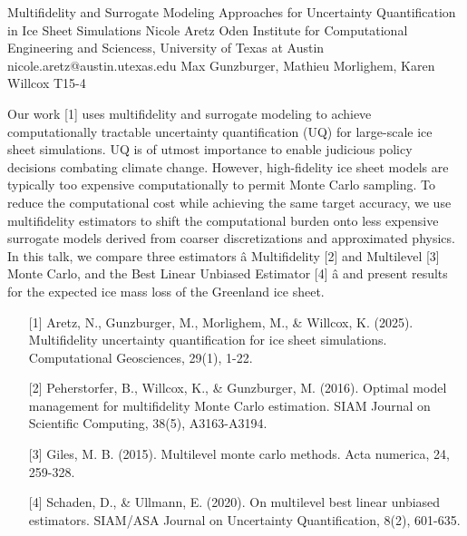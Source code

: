 \begin{talk}
  {Multifidelity and Surrogate Modeling Approaches for Uncertainty Quantification in Ice Sheet Simulations}%
  {Nicole Aretz}%
  {Oden Institute for Computational Engineering and Sciencess, University of Texas at Austin}%
  {nicole.aretz@austin.utexas.edu}%
  {Max Gunzburger, Mathieu Morlighem, Karen Willcox}%
  {T15-4}%
			
Our work [1] uses multifidelity and surrogate modeling to achieve computationally tractable uncertainty quantification (UQ) for large-scale ice sheet simulations. UQ is of utmost importance to enable judicious policy decisions combating climate change. However, high-fidelity ice sheet models are typically too expensive computationally to permit Monte Carlo sampling. To reduce the computational cost while achieving the same target accuracy, we use multifidelity estimators to shift the computational burden onto less expensive surrogate models derived from coarser discretizations and approximated physics. In this talk, we compare three estimators â Multifidelity [2] and Multilevel [3] Monte Carlo, and the Best Linear Unbiased Estimator [4] â and present results for the expected ice mass loss of the Greenland ice sheet.

\medskip

\begin{enumerate}
	\item[{[1]}] Aretz, N., Gunzburger, M., Morlighem, M., \& Willcox, K. (2025). Multifidelity uncertainty quantification for ice sheet simulations. Computational Geosciences, 29(1), 1-22.
	\item[{[2]}] Peherstorfer, B., Willcox, K., \& Gunzburger, M. (2016). Optimal model management for multifidelity Monte Carlo estimation. SIAM Journal on Scientific Computing, 38(5), A3163-A3194.
    \item[{[3]}] Giles, M. B. (2015). Multilevel monte carlo methods. Acta numerica, 24, 259-328.
    \item[{[4]}] Schaden, D., \& Ullmann, E. (2020). On multilevel best linear unbiased estimators. SIAM/ASA Journal on Uncertainty Quantification, 8(2), 601-635.
\end{enumerate}

\end{talk}


